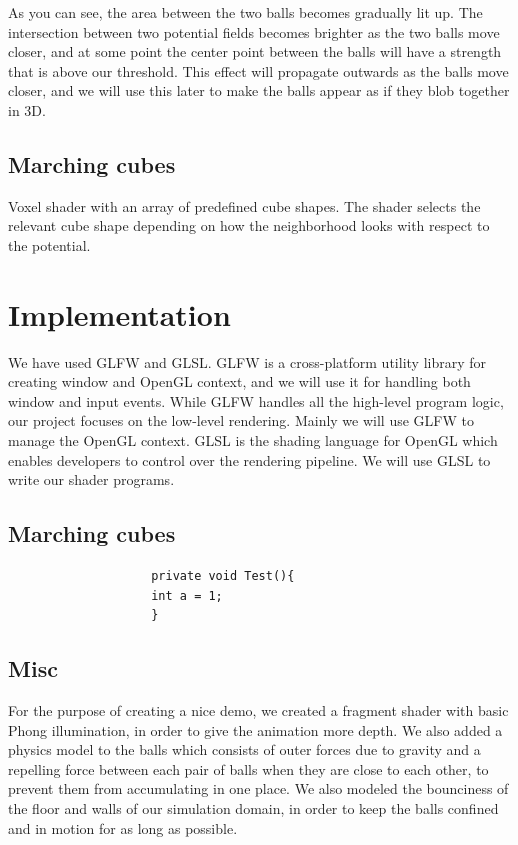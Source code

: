 \documentclass{article}
\begin{document}
\begin{multicols}{2}
            As you can see, the area between the two balls becomes gradually lit up.
            The intersection between two potential fields becomes brighter as the two balls move closer, and at some point the center point between the balls will have a strength that is above our threshold. This effect will propagate outwards as the balls move closer, and we will use this later to make the balls appear as if they blob together in 3D.

        \subsection{Marching cubes}
            Voxel shader with an array of predefined cube shapes. The shader selects the relevant cube shape depending on how the neighborhood looks with respect to the potential.

    \section{Implementation}

        We have used GLFW and GLSL. GLFW is a cross-platform utility library for creating window and OpenGL context, and we will use it for handling both window and input events. While GLFW handles all the high-level program logic, our project focuses on the low-level rendering. Mainly we will use GLFW to manage the OpenGL context. GLSL is the shading language for OpenGL which enables developers to control over the rendering pipeline. We will use GLSL to write our shader programs.
        
        \subsection{Marching cubes}
        	\begin{minipage}{\linewidth}
			    \begin{lstlisting}
					private void Test(){
					int a = 1;
					}
				\end{lstlisting}
        	\end{minipage}

        \subsection{Misc}
            For the purpose of creating a nice demo, we created a fragment shader with basic Phong illumination, in order to give the animation more depth.
            We also added a physics model to the balls which consists of outer forces due to gravity and a repelling force between each pair of balls when they are close to each other, to prevent them from accumulating in one place.
            We also modeled the bounciness of the floor and walls of our simulation domain, in order to keep the balls confined and in motion for as long as possible.


\end{multicols}
\end{document}
